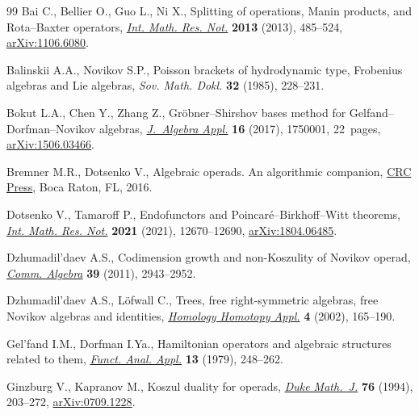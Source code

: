 \documentclass[11pt]{article}
\numberwithin{equation}{section}
\numberwithin{equation}{section}
\begin{document}
\begin{thebibliography}{99}
Bai C., Bellier O., Guo L., Ni X., Splitting of operations, {M}anin products,
 and {R}ota--{B}axter operators, \href{https://doi.org/10.1093/imrn/rnr266}{\textit{Int. Math. Res. Not.}} \textbf{2013}
 (2013), 485--524, \href{https://arxiv.org/abs/1106.6080}{arXiv:1106.6080}.

Balinskii A.A., Novikov S.P., Poisson brackets of hydrodynamic type,
 {F}robenius algebras and {L}ie algebras, \textit{Sov. Math. Dokl.}
 \textbf{32} (1985), 228--231.

Bokut L.A., Chen Y., Zhang Z., Gr\"obner--{S}hirshov bases method for
 {G}elfand--{D}orfman--{N}ovikov algebras, \href{https://doi.org/10.1142/S0219498817500013}{\textit{J.~Algebra Appl.}}
 \textbf{16} (2017), 1750001, 22~pages, \href{https://arxiv.org/abs/1506.03466}{arXiv:1506.03466}.

Bremner M.R., Dotsenko V., Algebraic operads. {A}n algorithmic companion, \href{https://doi.org/10.1201/b20061}{CRC
 Press}, Boca Raton, FL, 2016.

Dotsenko V., Tamaroff P., Endofunctors and {P}oincar\'e--{B}irkhoff--{W}itt
 theorems, \href{https://doi.org/10.1093/imrn/rnz369}{\textit{Int. Math. Res. Not.}} \textbf{2021} (2021), 12670--12690,
 \href{https://arxiv.org/abs/1804.06485}{arXiv:1804.06485}.

Dzhumadil'daev A.S., Codimension growth and non-{K}oszulity of {N}ovikov
 operad, \href{https://doi.org/10.1080/00927870903386494}{\textit{Comm. Algebra}} \textbf{39} (2011), 2943--2952.

Dzhumadil'daev A.S., L\"ofwall C., Trees, free right-symmetric algebras, free
 {N}ovikov algebras and identities, \href{https://doi.org/10.4310/hha.2002.v4.n2.a8}{\textit{Homology Homotopy Appl.}}
 \textbf{4} (2002), 165--190.

Gel'fand I.M., Dorfman I.Ya., Hamiltonian operators and algebraic structures
 related to them, \href{https://doi.org/10.1007/BF01078363}{\textit{Funct. Anal. Appl.}} \textbf{13} (1979), 248--262.

Ginzburg V., Kapranov M., Koszul duality for operads, \href{https://doi.org/10.1215/S0012-7094-94-07608-4}{\textit{Duke Math.~J.}}
 \textbf{76} (1994), 203--272, \href{https://arxiv.org/abs/0709.1228}{arXiv:0709.1228}.


\end{thebibliography}
\end{document}
